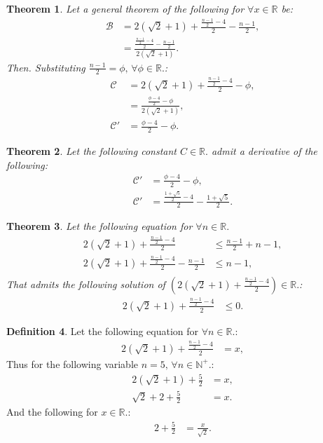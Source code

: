 \documentclass[10pt]{article}
\theoremstyle{plain}
\newtheorem{theorem}{Theorem}[section]
\theoremstyle{definition}
\newtheorem{definition}[theorem]{Definition}
\theoremstyle{remark}
\begin{document}
\begin{theorem}
	Let a general theorem of the following for $\forall x \in \mathbb{R}$ be:
	\begin{align*}
		\mathcal{B} &= 2(\sqrt{2} + 1) + \frac{\frac{n - 1}{2} - 4}{2} - \frac{n - 1}{2},\\
		&= \frac{\frac{\frac{n - 1}{2} - 4}{2} - \frac{n - 1}{2}}{2(\sqrt{2} + 1)}.
	\end{align*}
	Then. Substituting $\frac{n - 1}{2}=\phi, \, \forall \phi \in \mathbb{R}.$:
	\begin{align*}
		\mathcal{C} &= 2(\sqrt{2} + 1) + \frac{\frac{n - 1}{2} - 4}{2} - \phi,\\
		&= \frac{\frac{\phi - 4}{2} - \phi}{2(\sqrt{2} + 1)},\\
		\mathcal{C}' &= \frac{\phi - 4}{2} - \phi.
	\end{align*}
\end{theorem}

\begin{theorem}
	Let the following constant $C \in \mathbb{R}.$ admit a derivative of the following:
	\begin{align*}
		\mathcal{C}' &= \frac{\phi - 4}{2} - \phi,\\
		\mathcal{C}' &= \frac{\frac{1+\sqrt{5}}{2} - 4}{2} - \frac{1+\sqrt{5}}{2}.
	\end{align*}
\end{theorem}

\begin{theorem}
	Let the following equation for $\forall n \in \mathbb{R}.$
	\begin{align*}
		2(\sqrt{2} + 1) + \frac{\frac{n - 1}{2} - 4}{2}  &\leq \frac{n - 1}{2} + n - 1,\\
		2(\sqrt{2} + 1) + \frac{\frac{n - 1}{2} - 4}{2} - \frac{n - 1}{2} &\leq n - 1,\\
	\end{align*}
	 That admits the following solution of $(2(\sqrt{2} + 1) + \frac{\frac{n - 1}{2} - 4}{2}) \in \mathbb{R}.$:
	\begin{align*}
	 	2(\sqrt{2} + 1) + \frac{\frac{n - 1}{2} - 4}{2} &\leq 0.
	\end{align*}
\end{theorem}

\begin{definition}
	Let the following equation for $\forall n \in \mathbb{R}.$:
	\begin{align*}
		2(\sqrt{2} + 1) + \frac{\frac{n - 1}{2} - 4}{2} &= x,
	\end{align*}
	Thus for the following variable $n=5, \, \forall n \in \mathbb{N}^{+}.$:
	\begin{align*}
		2(\sqrt{2} + 1) + \frac{5}{2} &= x,\\
		\sqrt{2}+2 + \frac{5}{2} &= x.
	\end{align*}
	And the following for $x \in \mathbb{R}.$:
	\begin{align*}
		2+\frac{5}{2} &= \frac{x}{\sqrt{2}}.
	\end{align*}
\end{definition}
\end{document}

